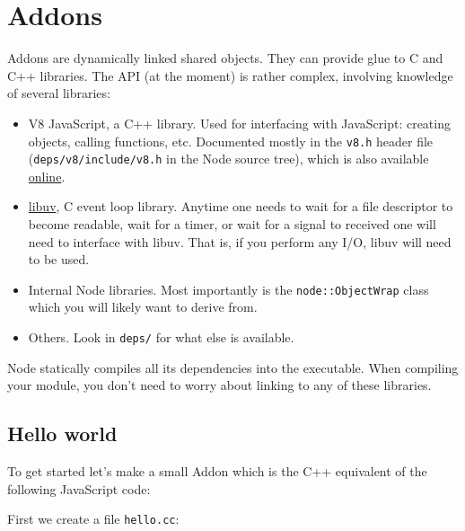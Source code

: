 \section{Addons}

Addons are dynamically linked shared objects. They can provide glue to C
and C++ libraries. The API (at the moment) is rather complex, involving
knowledge of several libraries:

\begin{itemize}
\item
  V8 JavaScript, a C++ library. Used for interfacing with JavaScript:
  creating objects, calling functions, etc. Documented mostly in the
  \texttt{v8.h} header file (\texttt{deps/v8/include/v8.h} in the Node
  source tree), which is also available
  \href{http://izs.me/v8-docs/main.html}{online}.
\item
  \href{https://github.com/joyent/libuv}{libuv}, C event loop library.
  Anytime one needs to wait for a file descriptor to become readable,
  wait for a timer, or wait for a signal to received one will need to
  interface with libuv. That is, if you perform any I/O, libuv will need
  to be used.
\item
  Internal Node libraries. Most importantly is the
  \texttt{node::ObjectWrap} class which you will likely want to derive
  from.
\item
  Others. Look in \texttt{deps/} for what else is available.
\end{itemize}

Node statically compiles all its dependencies into the executable. When
compiling your module, you don't need to worry about linking to any of
these libraries.

\subsection{Hello world}

To get started let's make a small Addon which is the C++ equivalent of
the following JavaScript code:

\begin{Shaded}
\begin{Highlighting}[]
 \NormalTok{= }\NormalTok{() \{ } \NormalTok{; \};}
\end{Highlighting}
\end{Shaded}

First we create a file \texttt{hello.cc}:

